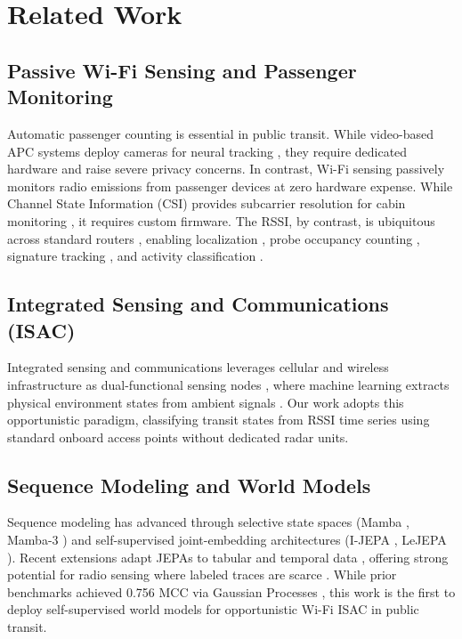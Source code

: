 \section{Related Work}

\subsection{Passive Wi-Fi Sensing and Passenger Monitoring}
Automatic passenger counting is essential in public transit. While video-based \ac{APC} systems deploy cameras for neural tracking \cite{pronello2023evaluating}, they require dedicated hardware and raise severe privacy concerns. In contrast, Wi-Fi sensing passively monitors radio emissions from passenger devices at zero hardware expense. While Channel State Information (CSI) provides subcarrier resolution for cabin monitoring \cite{wang2024csi}, it requires custom firmware. The \ac{RSSI}, by contrast, is ubiquitous across standard routers \cite{ahmad2024wifisensing}, enabling localization \cite{singh2021rssisurvey}, probe occupancy counting \cite{nitti2020iabacus}, signature tracking \cite{myrvoll2017counting}, and activity classification \cite{sigg2014telepathic}.

\subsection{Integrated Sensing and Communications (ISAC)}
Integrated sensing and communications leverages cellular and wireless infrastructure as dual-functional sensing nodes \cite{liu2022isac,gonzalezprelcic2024isac}, where machine learning extracts physical environment states from ambient signals \cite{luong2025mlisac}. Our work adopts this opportunistic paradigm, classifying transit states from \ac{RSSI} time series using standard onboard access points without dedicated radar units.

\subsection{Sequence Modeling and World Models}
Sequence modeling has advanced through selective state spaces (Mamba \cite{gu2023mamba}, Mamba-3 \cite{gu2026mamba3}) and self-supervised joint-embedding architectures (I-JEPA \cite{assran2023ijepa}, LeJEPA \cite{balestriero2025lejepa}). Recent extensions adapt JEPAs to tabular and temporal data \cite{thimonier2024tjepa,tsjepa2024,cfjepa2026}, offering strong potential for radio sensing where labeled traces are scarce \cite{radwan2025sslwifi}. While prior benchmarks achieved 0.756 \ac{MCC} via Gaussian Processes \cite{ribeiro2026eucnc}, this work is the first to deploy self-supervised world models for opportunistic Wi-Fi ISAC in public transit.

